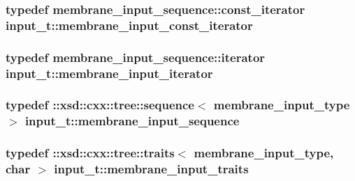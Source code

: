 \subsubsection[{\texorpdfstring{membrane\+\_\+input\+\_\+const\+\_\+iterator}{membrane_input_const_iterator}}]{\setlength{\rightskip}{0pt plus 5cm}typedef membrane\+\_\+input\+\_\+sequence\+::const\+\_\+iterator {\bf input\+\_\+t\+::membrane\+\_\+input\+\_\+const\+\_\+iterator}}\hypertarget{classinput__t_ad9f1a19dff09cac44dc94fd97b3ab778}{}\label{classinput__t_ad9f1a19dff09cac44dc94fd97b3ab778}
\subsubsection[{\texorpdfstring{membrane\+\_\+input\+\_\+iterator}{membrane_input_iterator}}]{\setlength{\rightskip}{0pt plus 5cm}typedef membrane\+\_\+input\+\_\+sequence\+::iterator {\bf input\+\_\+t\+::membrane\+\_\+input\+\_\+iterator}}\hypertarget{classinput__t_a2a9ad5a60f532541071c8432e3f3333b}{}\label{classinput__t_a2a9ad5a60f532541071c8432e3f3333b}
\subsubsection[{\texorpdfstring{membrane\+\_\+input\+\_\+sequence}{membrane_input_sequence}}]{\setlength{\rightskip}{0pt plus 5cm}typedef \+::xsd\+::cxx\+::tree\+::sequence$<$ {\bf membrane\+\_\+input\+\_\+type} $>$ {\bf input\+\_\+t\+::membrane\+\_\+input\+\_\+sequence}}\hypertarget{classinput__t_a455e36bc8b009abdbd13c6d167864cfe}{}\label{classinput__t_a455e36bc8b009abdbd13c6d167864cfe}
\subsubsection[{\texorpdfstring{membrane\+\_\+input\+\_\+traits}{membrane_input_traits}}]{\setlength{\rightskip}{0pt plus 5cm}typedef \+::xsd\+::cxx\+::tree\+::traits$<$ {\bf membrane\+\_\+input\+\_\+type}, char $>$ {\bf input\+\_\+t\+::membrane\+\_\+input\+\_\+traits}}\hypertarget{classinput__t_a7d8560c1644f93d6491d5aad368aeddb}{}\label{classinput__t_a7d8560c1644f93d6491d5aad368aeddb}
